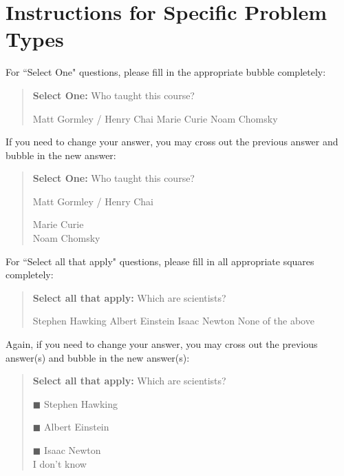 \documentclass[11pt,addpoints,answers]{exam}
\begin{document}
\section*{Instructions for Specific Problem Types}

For ``Select One" questions, please fill in the appropriate bubble completely:

\begin{quote}
\textbf{Select One:} Who taught this course?
     \begin{checkboxes}
     \CorrectChoice Matt Gormley / Henry Chai
     \choice Marie Curie
     \choice Noam Chomsky
    \end{checkboxes}
\end{quote}

If you need to change your answer, you may cross out the previous answer and bubble in the new answer:

\begin{quote}
\textbf{Select One:} Who taught this course?
\begin{list}{}
     \item\CIRCLE{} Matt Gormley / Henry Chai
     \item\Circle{} Marie Curie\\
     \xcancel{\CIRCLE}{} Noam Chomsky
\end{list}
\end{quote}


For ``Select all that apply" questions, please fill in all appropriate squares completely:

\begin{quote}
\textbf{Select all that apply:} Which are scientists?
{
    \checkboxchar{$\Box$} \checkedchar{$\blacksquare$}
    \begin{checkboxes}
     \choice Stephen Hawking 
     \CorrectChoice Albert Einstein
     \choice Isaac Newton
     \choice None of the above
    \end{checkboxes}
    }
\end{quote}

Again, if you need to change your answer, you may cross out the previous answer(s) and bubble in the new answer(s):

\begin{quote}
\textbf{Select all that apply:} Which are scientists?
    \begin{list}{}
    \item $\blacksquare$ Stephen Hawking 
    \item $\blacksquare$ Albert Einstein
    \item $\blacksquare$ Isaac Newton\\
    \xcancel{$\blacksquare$} I don't know
\end{list}
\end{quote}
\end{document}
